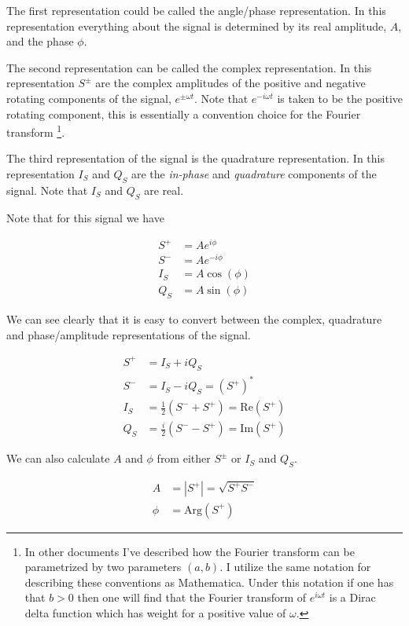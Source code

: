 \documentclass[12pt]{article}
\begin{document}
The first representation could be called the angle/phase representation. In this representation everything about the signal is determined by its real amplitude, $A$, and the phase $\phi$.

The second representation can be called the complex representation. In this representation $S^{\pm}$ are the complex amplitudes of the positive and negative rotating components of the signal, $e^{\pm \omega t}$. Note that $e^{-i\omega t}$ is taken to be the positive rotating component, this is essentially a convention choice for the Fourier transform \footnote{In other documents I've described how the Fourier transform can be parametrized by two parameters $(a,b)$. I utilize the same notation for describing these conventions as Mathematica. Under this notation if one has that $b>0$ then one will find that the Fourier transform of $e^{i\omega t}$ is a Dirac delta function which has weight for a positive value of $\omega$.}.

The third representation of the signal is the quadrature representation. In this representation $I_S$ and $Q_S$ are the \textit{in-phase} and \textit{quadrature} components of the signal. Note that $I_S$ and $Q_S$ are real.

Note that for this signal we have

\begin{align}
S^+ &= Ae^{i\phi}\\
S^- &= Ae^{-i\phi}\\
I_S &= A\cos(\phi)\\
Q_S &= A\sin(\phi)
\end{align}

We can see clearly that it is easy to convert between the complex, quadrature and phase/amplitude representations of the signal.

\begin{align}
S^+ &= I_S + i Q_S\\
S^- &= I_S - i Q_S = \left(S^+\right)^*\\
I_S &= \frac{1}{2}\left(S^- + S^+\right) = \text{Re}(S^+)\\
Q_S &= \frac{i}{2}\left(S^- - S^+\right) = \text{Im}(S^+)
\end{align}

We can also calculate $A$ and $\phi$ from either $S^{\pm}$ or $I_S$ and $Q_S$.

\begin{align}
A &= |S^+| = \sqrt{S^+S^-}\\
\phi &= \text{Arg}(S^+)
\end{align}
\end{document}
